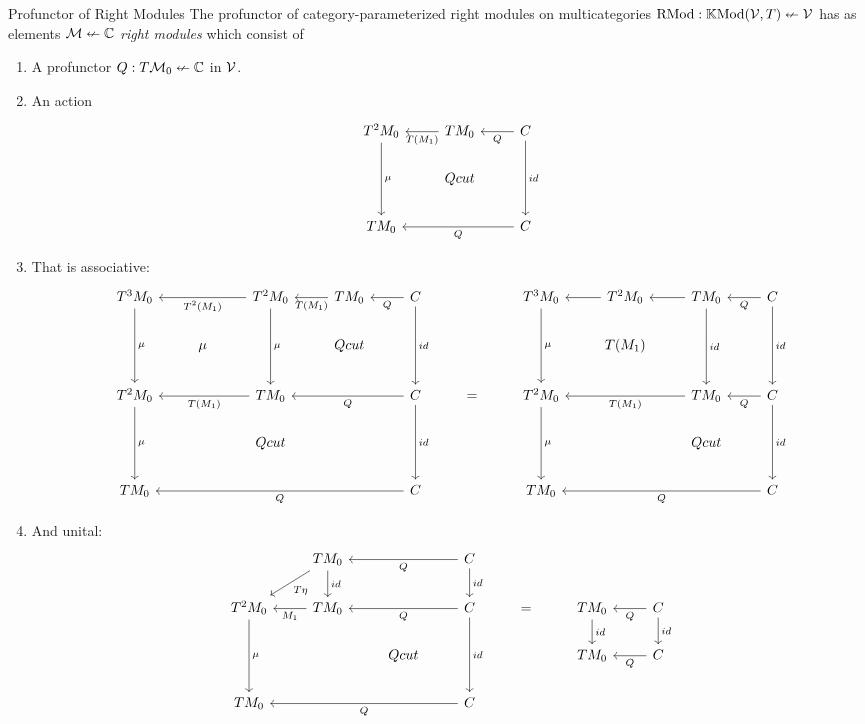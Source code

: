 \documentclass{article}
\begin{document}
\begin{definition}{Profunctor of Right Modules}
  The profunctor of category-parameterized right modules on
  multicategories $\text{RMod} : \mathbb{K}\text{Mod}(\mathcal{V},T) \nleftarrow \mathcal V$ has as elements
  $\mathcal M \nleftarrow \mathbb C$ \emph{right modules} which consist of
  \begin{enumerate}
  \item A profunctor $Q : T \mathcal M_0 \nleftarrow \mathbb C$ in $\mathcal V$.
  \item An action
    \[
\begin{tikzcd}
T^2M_0 \arrow[dd, "\mu"] & T M_0 \arrow[l, "T(M_1)"] & C \arrow[dd, "id"] \arrow[l, "Q"] \\
 & Qcut &  \\
TM_0 &  & C \arrow[ll, "Q"]
\end{tikzcd}
\]
  \item That is associative:
    \[
    \begin{tikzcd}
T^3M_0 \arrow[dd, "\mu"] &  & T^2M_0 \arrow[dd, "\mu"] \arrow[ll, "T^2(M_1)"] & T M_0 \arrow[l, "T(M_1)"] & C \arrow[dd, "id"] \arrow[l, "Q"] &  & T^3M_0 \arrow[dd, "\mu"] & T^2M_0 \arrow[l] & TM_0 \arrow[l] \arrow[dd, "id"] & C \arrow[l, "Q"] \arrow[dd, "id"] \\
 & \mu &  & Qcut &  &  &  & T(M_1) &  &  \\
T^2M_0 \arrow[dd, "\mu"] &  & TM_0 \arrow[ll, "T(M_1)"] &  & C \arrow[ll, "Q"] \arrow[dd, "id"] & = & T^2M_0 \arrow[dd, "\mu"] &  & TM_0 \arrow[ll, "T(M_1)"] & C \arrow[l, "Q"] \arrow[dd, "id"] \\
 &  & Qcut &  &  &  &  &  & Qcut &  \\
TM_0 &  &  &  & C \arrow[llll, "Q"] &  & TM_0 &  &  & C \arrow[lll, "Q"]
\end{tikzcd}
    \]
  \item And unital:
    \[\begin{tikzcd}
 & TM_0 \arrow[ld, "T\eta"] \arrow[d, "id"] &  & C \arrow[ll, "Q"] \arrow[d, "id"] &  &  &  \\
T^2M_0 \arrow[dd, "\mu"] & TM_0 \arrow[l, "M_1"] &  & C \arrow[ll, "Q"] \arrow[dd, "id"] & = & TM_0 \arrow[d, "id"] & C \arrow[d, "id"] \arrow[l, "Q"] \\
 &  & Qcut &  &  & TM_0 & C \arrow[l, "Q"] \\
TM_0 &  &  & C \arrow[lll, "Q"] &  &  & 
    \end{tikzcd}\]
  \end{enumerate}


\end{definition}
\end{document}
